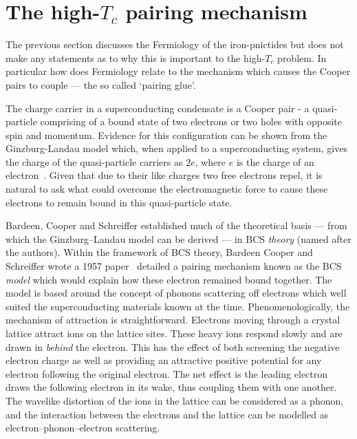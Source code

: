 

\section{The high-$T_c$ pairing mechanism}
\label{Sec:Intro:Nesting}

The previous section discusses the Fermiology of the iron-pnictides but does not make any statements as to why this is important to the high-$T_c$ problem. In particular how does Fermiology relate to the mechanism which causes the Cooper pairs to couple --- the so called `pairing glue'. 

The charge carrier in a superconducting condensate is a Cooper pair - a quasi-particle comprising of a bound state of two electrons or two holes with opposite spin and momentum. Evidence for this configuration can be shown from the Ginzburg-Landau model which, when applied to a superconducting system, gives the charge of the quasi-particle carriers as $2e$, where $e$ is the charge of an electron~\cite{Annett2010}. Given that due to their like charges two free electrons repel, it is natural to ask what could overcome the electromagnetic force to cause these electrons to remain bound in this quasi-particle state.

Bardeen, Cooper and Schreiffer established much of the theoretical basis --- from which the Ginzburg--Landau model can be derived --- in \ac{BCS} \emph{theory} (named after the authors). Within the framework of \ac{BCS} theory, Bardeen Cooper and Schreiffer wrote a 1957 paper~\cite{Bardeen1957} detailed a pairing mechanism known as the \ac{BCS} \emph{model} which would explain how these electron remained bound together. The model is based around the concept of phonons scattering off electrons which well suited the superconducting materials known at the time. Phenomenologically, the mechanism of attraction is straightforward. Electrons moving through a crystal lattice attract ions on the lattice sites. These heavy ions respond slowly and are drawn in \emph{behind} the electron. This has the effect of both screening the negative electron charge as well as providing an attractive positive potential for any electron following the original electron. The net effect is the leading electron draws the following electron in its wake, thus coupling them with one another. The wavelike distortion of the ions in the lattice can be considered as a phonon, and the interaction between the electrons and the lattice can be modelled as electron--phonon--electron scattering.

